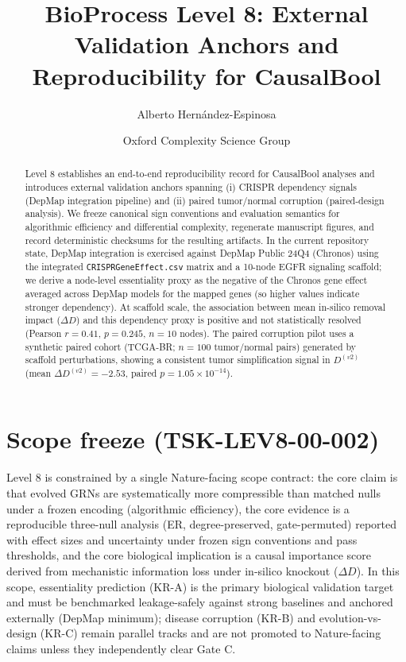 \documentclass[11pt]{article}
\title{\textbf{BioProcess Level 8: External Validation Anchors and Reproducibility for CausalBool}}
\author[1,*]{Alberto Hernández-Espinosa}
\author[1]{Oxford Complexity Science Group}
\affil[1]{Department of Computer Science, University of Oxford}
\affil[*]{Corresponding author: alberto.hernandez@oxford.ac.uk}
\date{}
\begin{document}
\maketitle

\begin{abstract}
\noindent
Level 8 establishes an end-to-end reproducibility record for CausalBool analyses and introduces external validation anchors spanning (i) CRISPR dependency signals (DepMap integration pipeline) and (ii) paired tumor/normal corruption (paired-design analysis). We freeze canonical sign conventions and evaluation semantics for algorithmic efficiency and differential complexity, regenerate manuscript figures, and record deterministic checksums for the resulting artifacts. In the current repository state, DepMap integration is exercised against DepMap Public 24Q4 (Chronos) using the integrated \texttt{CRISPRGeneEffect.csv} matrix and a 10-node EGFR signaling scaffold; we derive a node-level essentiality proxy as the negative of the Chronos gene effect averaged across DepMap models for the mapped genes (so higher values indicate stronger dependency). At scaffold scale, the association between mean in-silico removal impact ($\Delta D$) and this dependency proxy is positive and not statistically resolved (Pearson $r=0.41$, $p=0.245$, $n=10$ nodes). The paired corruption pilot uses a synthetic paired cohort (TCGA-BR; $n=100$ tumor/normal pairs) generated by scaffold perturbations, showing a consistent tumor simplification signal in $D^{(v2)}$ (mean $\Delta D^{(v2)}=-2.53$, paired $p=1.05\times 10^{-14}$).
\end{abstract}

\section*{Scope freeze (TSK-LEV8-00-002)}
Level 8 is constrained by a single Nature-facing scope contract: the core claim is that evolved GRNs are systematically more compressible than matched nulls under a frozen encoding (algorithmic efficiency), the core evidence is a reproducible three-null analysis (ER, degree-preserved, gate-permuted) reported with effect sizes and uncertainty under frozen sign conventions and pass thresholds, and the core biological implication is a causal importance score derived from mechanistic information loss under in-silico knockout ($\Delta D$). In this scope, essentiality prediction (KR-A) is the primary biological validation target and must be benchmarked leakage-safely against strong baselines and anchored externally (DepMap minimum); disease corruption (KR-B) and evolution-vs-design (KR-C) remain parallel tracks and are not promoted to Nature-facing claims unless they independently clear Gate C.
\end{document}
